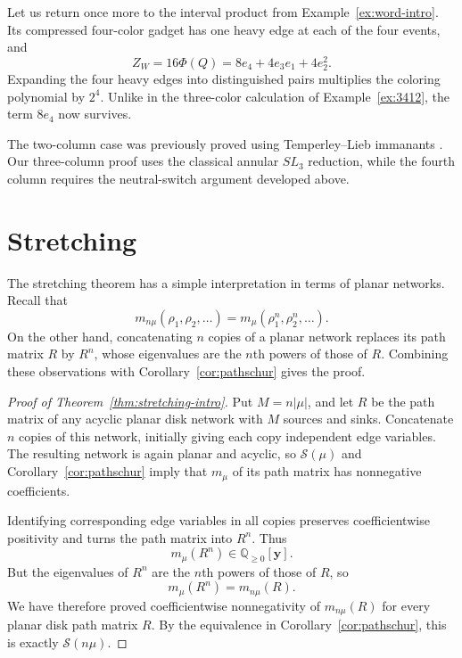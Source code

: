 \documentclass[11pt]{article}
\theoremstyle{definition}
\theoremstyle{remark}
\newcommand{\yy}{\mathbf y}
\begin{document}
Let us return once more to the interval product
from Example~\ref{ex:word-intro}. Its compressed
four-color gadget has one heavy edge at each
of the four events, and
\[
Z_W=16\Phi(Q)=8e_4+4e_3e_1+4e_2^2.
\]
Expanding the four heavy edges into distinguished
pairs multiplies the coloring polynomial by $2^4$.
Unlike in the three-color calculation of
Example~\ref{ex:3412}, the term $8e_4$ now survives.

The two-column case was previously proved using
Temperley--Lieb immanants \cite{CSS}. Our
three-column proof uses the classical annular
$SL_3$ reduction, while the fourth column
requires the neutral-switch argument developed
above.


\section{Stretching}\label{sec:stretching}


The stretching theorem has a simple interpretation
in terms of planar networks. Recall that
\[
m_{n\mu}(\rho_1,\rho_2,\ldots)
=m_\mu(\rho_1^n,\rho_2^n,\ldots).
\]
On the other hand, concatenating $n$ copies of
a planar network replaces its path matrix $R$
by $R^n$, whose eigenvalues are the $n$th powers
of those of $R$. Combining these observations
with Corollary~\ref{cor:pathschur} gives the proof.

\begin{proof}[Proof of Theorem~\ref{thm:stretching-intro}]
Put $M=n|\mu|$, and let $R$ be the path matrix
of any acyclic planar disk network with $M$
sources and sinks. Concatenate $n$ copies of
this network, initially giving each copy
independent edge variables. The resulting
network is again planar and acyclic, so
$\mathcal S(\mu)$ and
Corollary~\ref{cor:pathschur} imply that
$m_\mu$ of its path matrix has nonnegative
coefficients.

Identifying corresponding edge variables in
all copies preserves coefficientwise positivity
and turns the path matrix into $R^n$. Thus
\[
m_\mu(R^n)\in\mathbb Q_{\ge0}[\yy].
\]
But the eigenvalues of $R^n$ are the $n$th
powers of those of $R$, so
\[
m_\mu(R^n)=m_{n\mu}(R).
\]
We have therefore proved coefficientwise
nonnegativity of $m_{n\mu}(R)$ for every planar
disk path matrix $R$. By the equivalence in
Corollary~\ref{cor:pathschur}, this is exactly
$\mathcal S(n\mu)$.
\end{proof}
\end{document}
